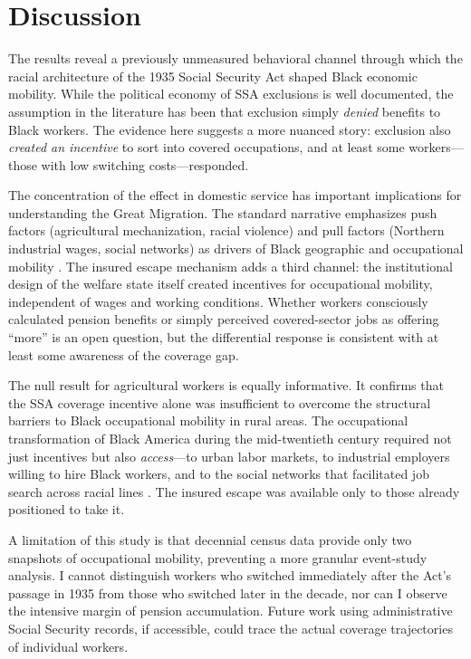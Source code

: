 \documentclass[12pt]{article}
\begin{document}
\section{Discussion}

The results reveal a previously unmeasured behavioral channel through which the racial architecture of the 1935 Social Security Act shaped Black economic mobility. While the political economy of SSA exclusions is well documented, the assumption in the literature has been that exclusion simply \textit{denied} benefits to Black workers. The evidence here suggests a more nuanced story: exclusion also \textit{created an incentive} to sort into covered occupations, and at least some workers---those with low switching costs---responded.

The concentration of the effect in domestic service has important implications for understanding the Great Migration. The standard narrative emphasizes push factors (agricultural mechanization, racial violence) and pull factors (Northern industrial wages, social networks) as drivers of Black geographic and occupational mobility \citep{boustan2010, hornbeck2014, collins1997}. The insured escape mechanism adds a third channel: the institutional design of the welfare state itself created incentives for occupational mobility, independent of wages and working conditions. Whether workers consciously calculated pension benefits or simply perceived covered-sector jobs as offering ``more'' is an open question, but the differential response is consistent with at least some awareness of the coverage gap.

The null result for agricultural workers is equally informative. It confirms that the SSA coverage incentive alone was insufficient to overcome the structural barriers to Black occupational mobility in rural areas. The occupational transformation of Black America during the mid-twentieth century required not just incentives but also \textit{access}---to urban labor markets, to industrial employers willing to hire Black workers, and to the social networks that facilitated job search across racial lines \citep{whatley1990, boustan2016}. The insured escape was available only to those already positioned to take it.

A limitation of this study is that decennial census data provide only two snapshots of occupational mobility, preventing a more granular event-study analysis. I cannot distinguish workers who switched immediately after the Act's passage in 1935 from those who switched later in the decade, nor can I observe the intensive margin of pension accumulation. Future work using administrative Social Security records, if accessible, could trace the actual coverage trajectories of individual workers.
\end{document}
